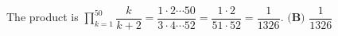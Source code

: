 The product is \(\displaystyle\prod_{k=1}^{50}\dfrac{k}{k+2}=\dfrac{1\cdot 2\cdots 50}{3\cdot 4\cdots 52}=\dfrac{1\cdot 2}{51\cdot 52}=\dfrac{1}{1326}\). \(\boxed{\textbf{(B) } \dfrac{1}{1326}}\)
